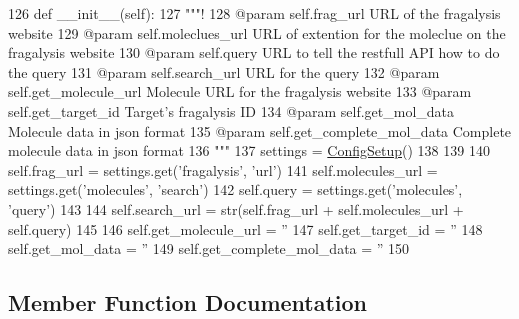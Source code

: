 \begin{DoxyCode}
126     \textcolor{keyword}{def }\_\_init\_\_(self):
127         \textcolor{stringliteral}{"""!}
128 \textcolor{stringliteral}{        @param self.frag\_url URL of the fragalysis website}
129 \textcolor{stringliteral}{        @param self.moleclues\_url URL of extention for the moleclue on the fragalysis website}
130 \textcolor{stringliteral}{        @param self.query URL to tell the restfull API how to do the query}
131 \textcolor{stringliteral}{        @param self.search\_url URL for the query }
132 \textcolor{stringliteral}{        @param self.get\_molecule\_url Molecule URL for the fragalysis website}
133 \textcolor{stringliteral}{        @param self.get\_target\_id Target's fragalysis ID }
134 \textcolor{stringliteral}{        @param self.get\_mol\_data Molecule data in json format}
135 \textcolor{stringliteral}{        @param self.get\_complete\_mol\_data Complete molecule data in json format}
136 \textcolor{stringliteral}{        """}
137         settings = \hyperlink{namespacefragalysis__api_1_1xcglobalscripts_1_1set__config_a9b5445f82604ad45c1e85e2b07e4a317}{ConfigSetup}()
138 
139 
140         self.frag\_url = settings.get(\textcolor{stringliteral}{'fragalysis'}, \textcolor{stringliteral}{'url'})
141         self.molecules\_url = settings.get(\textcolor{stringliteral}{'molecules'}, \textcolor{stringliteral}{'search'})
142         self.query = settings.get(\textcolor{stringliteral}{'molecules'}, \textcolor{stringliteral}{'query'})
143 
144         self.search\_url = str(self.frag\_url + self.molecules\_url + self.query)
145 
146         self.get\_molecule\_url = \textcolor{stringliteral}{''}
147         self.get\_target\_id = \textcolor{stringliteral}{''}
148         self.get\_mol\_data = \textcolor{stringliteral}{''}
149         self.get\_complete\_mol\_data = \textcolor{stringliteral}{''}
150 
\end{DoxyCode}


\subsection{Member Function Documentation}
\mbox{\label{classfragalysis__api_1_1xcextracter_1_1getdata_1_1_get_molecules_data_a5bf2f4562196e169f76aa30cdcd9029d}} 
